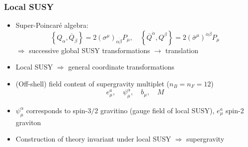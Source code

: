 \documentclass[10pt,aspectratio=169]{beamer}
\begin{document}
\begin{frame}
  \frametitle{Local SUSY}
  \begin{itemize} \itemsep1em
  \item Super-Poincar\'{e} algebra:
    \begin{equation*}
      \left \{ Q_\alpha, \overline{Q}_{\dot{\beta}} \right \} =
      2 \left ( \sigma^\mu \right )_{\alpha \dot{\beta}} P_\mu , \quad
      \left \{ \overline{Q}^{\dot{\alpha}} , Q^\beta \right \} =
      2 \left ( \bar{\sigma}^\mu \right)^{\dot{\alpha}\beta} P_\mu
    \end{equation*}
    $\Rightarrow$ successive global SUSY transformations $\to$ translation
  \item Local SUSY $\Rightarrow$ {\color{blue} general coordinate
    transformations}
  \item (Off-shell) field content of supergravity multiplet ($n_B = n_F = 12$)
    \begin{equation*}
      e^a_\mu , \quad \psi^\alpha_\mu, \quad b_\mu, \quad M
    \end{equation*}
  \item $\psi^\alpha_\mu$ corresponds to spin-$3/2$ gravitino (gauge field of
    local SUSY), $e^a_\mu$ spin-2 graviton
  \item Construction of theory invariant under local SUSY
    $\Rightarrow$ {\color{blue} supergravity}
  \end{itemize}
\end{frame}
\end{document}
